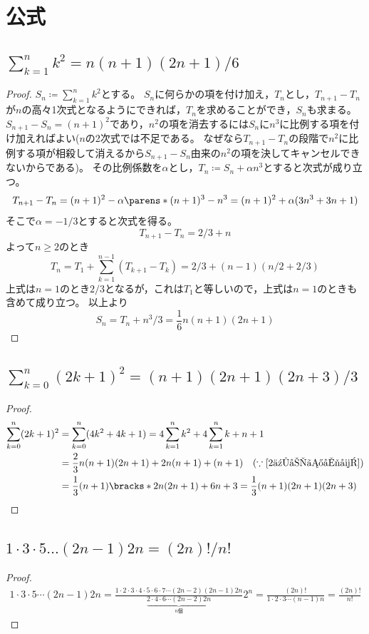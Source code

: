 \chapter{公式}
    \section{\texorpdfstring{$\sum_{k=1}^n k^2 = n(n+1)(2n+1)/6$}{2乗和の公式}}
        \label{2乗和の公式}
        \begin{proof}
            $S_n \coloneq \sum_{k=1}^n k^2$とする。
            $S_n$に何らかの項を付け加え，$T_n$とし，$T_{n+1} - T_n$が$n$の高々1次式となるようにできれば，$T_n$を求めることができ，$S_n$も求まる。
            $S_{n+1} - S_n = (n+1)^2$であり，$n^2$の項を消去するには$S_n$に$n^3$に比例する項を付け加えればよい($n$の2次式では不足である。
            なぜなら$T_{n+1} - T_n$の段階で$n^2$に比例する項が相殺して消えるから$S_{n+1} - S_n$由来の$n^2$の項を決してキャンセルできないからである)。
            その比例係数を$\alpha$とし，$T_n \coloneq S_n + \alpha n^3$とすると次式が成り立つ。
            \[ T_{n+1} - T_n = (n+1)^2 - \alpha\parens*{(n+1)^3-n^3} = (n+1)^2 + \alpha(3n^3+3n+1) \]
            そこで$\alpha=-1/3$とすると次式を得る。
            \[ T_{n+1} - T_n = 2/3 + n \]
            よって$n\geq 2$のとき
            \[ T_n = T_1 + \sum_{k=1}^{n-1} (T_{k+1} - T_k) = 2/3 + (n-1)(n/2 + 2/3) \]
            上式は$n=1$のとき$2/3$となるが，これは$T_1$と等しいので，上式は$n=1$のときも含めて成り立つ。
            以上より
            \[ S_n = T_n + n^3/3 = \frac{1}{6}n(n+1)(2n+1) \]
        \end{proof}
    \section{\texorpdfstring{$\sum_{k=0}^n (2k+1)^2 = (n+1)(2n+1)(2n+3)/3$}{奇数の2乗和の公式}}
        \begin{proof}
            \begin{align*}
                \sum_{k=0}^n (2k+1)^2 &= \sum_{k=0}^n (4k^2+4k+1) = 4\sum_{k=1}^n k^2 + 4\sum_{k=1}^n k + n+1 \\
                &= \frac{2}{3}n(n+1)(2n+1) + 2n(n+1) + (n+1) \quad (\because \ref{2乗和の公式}) \\
                &= \frac{1}{3}(n+1)\bracks*{2n(2n+1) + 6n + 3} = \frac{1}{3}(n+1)(2n+1)(2n+3)
            \end{align*}
        \end{proof}
    \section{\texorpdfstring{$1\cdot3\cdot5\dots(2n-1)2n = (2n)!/n!$}{1・3・5・(2n-1)・2n = (2n!)/n!}}
        \begin{proof}
            \begin{align*}
                1 \cdot 3 \cdot 5 \dotsm (2n-1)2n = \frac{1 \cdot 2 \cdot 3 \cdot 4 \cdot 5 \cdot 6 \cdot 7 \dotsm (2n-2)(2n-1)2n}{\underbrace{2 \cdot 4 \cdot 6 \dotsm(2n-2)2n}_{n\text{個}}}2^n = \frac{(2n)!}{1 \cdot 2 \cdot 3 \dotsm (n-1)n} = \frac{(2n)!}{n!}
            \end{align*}
        \end{proof}
